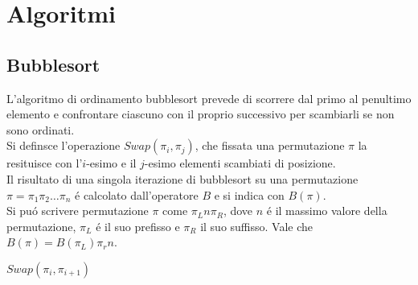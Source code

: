 \section*{Algoritmi}
\subsection*{Bubblesort}
L'algoritmo di ordinamento bubblesort prevede di scorrere dal primo al penultimo elemento e confrontare ciascuno con il proprio successivo per scambiarli se non sono ordinati.\\
Si definsce l'operazione $Swap(\pi_i,\pi_j)$, che fissata una permutazione $\pi$ la resituisce con l'$i$-esimo e il $j$-esimo elementi scambiati di posizione. \\
Il risultato di una singola iterazione di bubblesort su una permutazione $\pi=\pi_1\pi_2\dots\pi_n$ \'e calcolato dall'operatore $B$ e si indica con $B(\pi)$.\\
Si pu\'o scrivere permutazione $\pi$ come $\pi_Ln\pi_R$, dove $n$ \'e il massimo valore della permutazione, $\pi_L$ \'e il suo prefisso e $\pi_R$ il suo suffisso. Vale che $B(\pi) = B(\pi_L)\pi_rn$.\\
\begin{algorithm}[H]
   \caption{$B - bubblesort$}
\begin{algorithmic}[1]
   \State $Swap(\pi_i,\pi_{i+1})$
   \EndIf
   \EndFor
\end{algorithmic}
\end{algorithm}
